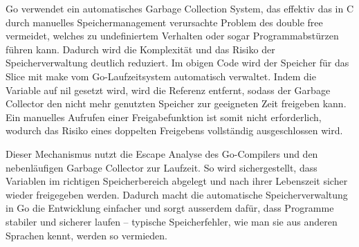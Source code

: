 Go verwendet ein automatisches Garbage Collection System, das effektiv 
das in C durch manuelles Speichermanagement verursachte Problem des 
double free vermeidet, welches zu undefiniertem Verhalten oder sogar 
Programmabstürzen führen kann. Dadurch wird die Komplexität und das 
Risiko der Speicherverwaltung deutlich reduziert\autocite{TheGolangMemoryModel}. Im obigen Code wird 
der Speicher für das Slice mit make vom Go-Laufzeitsystem automatisch 
verwaltet. Indem die Variable auf nil gesetzt wird, wird die Referenz 
entfernt, sodass der Garbage Collector den nicht mehr genutzten Speicher 
zur geeigneten Zeit freigeben kann. Ein manuelles Aufrufen einer 
Freigabefunktion ist somit nicht erforderlich, wodurch das Risiko 
eines doppelten Freigebens vollständig ausgeschlossen wird.

Dieser Mechanismus nutzt die Escape Analyse des Go-Compilers und den nebenläufigen 
Garbage Collector zur Laufzeit. So wird sichergestellt, dass Variablen im richtigen 
Speicherbereich abgelegt und nach ihrer Lebenszeit sicher wieder freigegeben werden\autocite{TheGolangMemoryModel}. 
Dadurch macht die automatische Speicherverwaltung in Go die Entwicklung einfacher und sorgt ausserdem dafür, 
dass Programme stabiler und sicherer laufen – typische Speicherfehler, wie man sie aus anderen Sprachen kennt, 
werden so vermieden.

